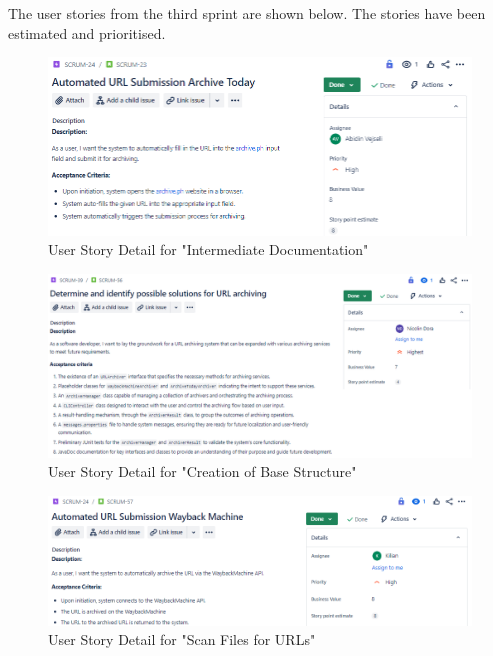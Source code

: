 The user stories from the third sprint are shown below. The stories have been estimated and prioritised.
\begin{figure}[h!]
    \centering
    \includegraphics[width=1\textwidth]{pictures/Scrum/Sprint 3/UserStory_8}
    \caption{User Story Detail for "Intermediate Documentation"}
    \label{fig:sprint_3_userstory_1}
\end{figure}
\begin{figure}[h!]
    \centering
    \includegraphics[width=1\textwidth]{pictures/Scrum/Sprint 3/UserStory_14}
    \caption{User Story Detail for "Creation of Base Structure"}
    \label{fig:sprint_3_userstory_2}
\end{figure}
\begin{figure}[h!]
    \centering
    \includegraphics[width=1\textwidth]{pictures/Scrum/Sprint 3/UserStory_15}
    \caption{User Story Detail for "Scan Files for URLs"}
    \label{fig:sprint_3_userstory_3}
\end{figure}
\clearpage

